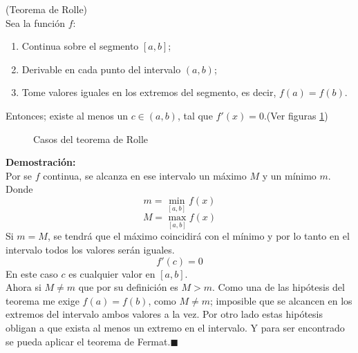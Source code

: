 \documentclass[10pt,twoside]{SelfArx} %
\begin{document}
\begin{teorema}
	(Teorema de Rolle)\\
	Sea la función $ f $:
	\begin{enumerate}
		\item Continua sobre el segmento $ [a,b] $;
		\item Derivable en cada punto del intervalo $ (a,b) $;
		\item Tome valores iguales en los extremos del segmento, es decir, $ f(a)=f(b) $.
	\end{enumerate}
	Entonces; existe al menos un $ c\in(a,b) $, tal que $ f'(x)=0 $.(Ver figuras \ref{rolle})
\end{teorema}
\begin{figure}[h]
\centering
{}
\caption{Casos del teorema de Rolle}
\label{rolle}
\end{figure}
 \textbf{Demostración:}\\
 Por se $ f $ continua, se alcanza en ese intervalo un máximo $ M $ y un mínimo $ m $. Donde 
 \[ m=\min_{[a,b]}f(x) \]
 \[ M=\max_{[a,b]}f(x) \]
 Si $ m=M $, se tendr\'a que el máximo coincidirá con el mínimo y por lo tanto en el intervalo todos los valores serán iguales.
 \begin{equation}
 f'(c)=0
 \end{equation}
 En este caso $ c $ es cualquier valor en $ [a,b] $.\\
 Ahora si $ M\neq m $ que por su definici\'on es $ M>m $. Como una de las hipótesis del teorema me exige $ f(a)=f(b) $, como $ M\neq m $; imposible que se alcancen en los extremos del intervalo ambos valores a la vez. Por otro lado estas hipótesis obligan a que exista al menos un extremo en el intervalo. Y para ser encontrado se pueda aplicar el teorema de Fermat.$ \blacksquare $
 
\end{document}

